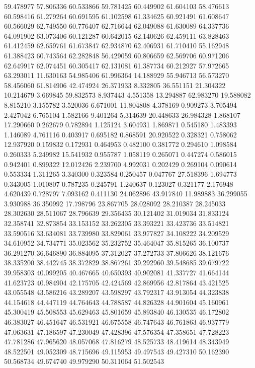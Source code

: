 59.478977
57.806336
60.533866
59.781425
60.449902
61.604103
58.476613
60.598416
61.279264
60.691595
61.102598
61.334625
60.921491
61.608647
60.566029
62.749550
60.776407
62.716644
62.049088
61.630089
64.337736
64.091902
63.073406
60.121287
60.642015
62.140626
62.459111
63.828463
61.412459
62.659761
61.673847
62.934870
62.406931
61.710410
55.162948
61.388423
60.743564
62.282848
56.429059
60.806659
62.569706
60.971206
62.649917
62.074451
60.305417
62.131081
61.387734
60.212927
57.972665
63.293011
11.630163
54.985406
61.996364
14.188929
55.946713
56.573270
58.456060
61.814906
42.474924
26.371933
8.332805
36.551151
21.304322
10.214679
3.669845
59.832573
8.937443
4.551358
13.294887
62.983270
19.588082
8.815210
3.155782
3.520036
6.671001
11.804808
4.378169
0.909273
3.705494
2.427042
6.765104
1.582166
9.401264
5.314639
20.448633
26.984328
1.868107
17.290660
0.262679
0.782894
1.125124
3.604931
1.869871
0.545180
1.483393
1.146089
4.761116
0.403917
0.695182
0.868591
20.920522
0.328321
0.758062
12.937920
0.159832
0.172931
0.464953
0.482100
0.381772
0.294610
1.098584
0.260333
5.249982
15.541932
0.955787
1.058119
0.265071
0.447274
0.586015
0.942401
0.899322
12.012426
2.239700
4.992031
0.202429
0.269104
0.090614
0.553334
1.311265
3.340300
0.323584
0.250457
0.047767
27.518396
1.694773
0.343005
1.010807
0.787235
0.245791
1.240637
0.123027
0.321177
2.176948
4.620439
0.728797
7.093162
0.411130
24.062896
43.917840
11.989883
36.299055
3.930988
36.350992
17.798796
23.867705
28.028092
28.210387
28.245033
28.302630
28.511067
28.796639
29.356435
30.121402
31.019034
31.833124
32.358741
32.873854
33.153152
33.262305
33.393221
33.423736
33.514821
33.590516
33.634081
33.739980
33.829061
33.977827
34.108222
34.209529
34.610952
34.734771
35.023562
35.232752
35.464047
35.815265
36.100737
36.291270
36.646890
36.884095
37.312027
37.272733
37.806626
38.121676
38.335200
38.442745
38.372829
38.867261
39.292960
39.548685
39.679722
39.958303
40.099205
40.467665
40.650393
40.902081
41.337727
41.664144
41.623723
40.984904
42.175705
42.424569
42.869956
42.817864
43.421525
43.055548
43.586216
43.289207
43.598297
43.792317
43.913054
44.323838
44.154618
44.447119
44.764643
44.788587
44.826328
44.901604
45.160961
45.300419
45.508553
45.629463
45.801659
45.893840
46.130535
46.172802
46.383027
46.451647
46.531921
46.675558
46.747643
46.761863
46.937779
47.063631
47.186597
47.230049
47.428396
47.576354
47.358651
47.728223
47.781286
47.965620
48.057068
47.816279
48.525733
48.419614
48.343949
48.522501
49.052309
48.715696
49.115953
49.497543
49.427310
50.162390
50.568734
49.674740
49.979290
50.311064
51.502543
